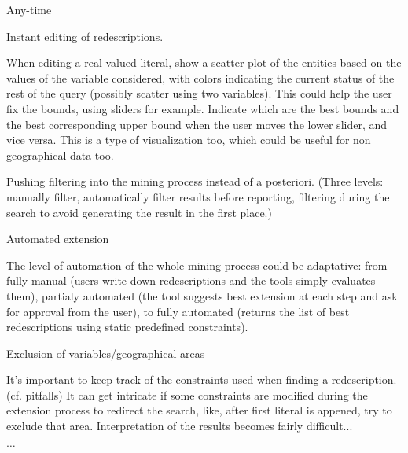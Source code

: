 Any-time

Instant editing of redescriptions.

When editing a real-valued literal, show a scatter plot of the
entities based on the values of the variable considered, with colors
indicating the current status of the rest of the query (possibly
scatter using two variables). This could help the user fix the bounds,
using sliders for example.  Indicate which are the best bounds and the
best corresponding upper bound when the user moves the lower slider,
and vice versa.  This is a type of visualization too, which could be
useful for non geographical data too.

Pushing filtering into the mining process instead of a
posteriori. (Three levels: manually filter, automatically filter
results before reporting, filtering during the search to avoid
generating the result in the first place.)

Automated extension

The level of automation of the whole mining process could be adaptative: from fully manual (users write down redescriptions and the tools simply evaluates them), partialy automated (the tool suggests best extension at each step and ask for approval from the user), to fully automated (returns the list of best redescriptions using static predefined constraints).

Exclusion of variables/geographical areas

It's important to keep track of the constraints used when finding a
redescription. (cf. pitfalls) It can get intricate if some constraints
are modified during the extension process to redirect the search, like, after first literal is appened, try to exclude that area. Interpretation of the results becomes fairly difficult...

$\ldots$

